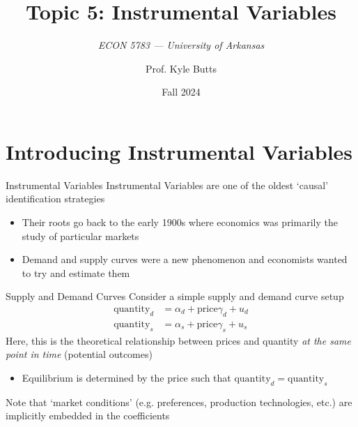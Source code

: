 \documentclass[aspectratio=169,t,11pt,table]{beamer}
\title{Topic 5: Instrumental Variables}
\subtitle{\it  ECON 5783 — University of Arkansas}
\date{Fall 2024}
\author{Prof. Kyle Butts}
\begin{document}
\begin{frame}
\maketitle

\end{frame}

\section{Introducing Instrumental Variables}

\begin{frame}{Instrumental Variables}
  Instrumental Variables are one of the oldest `causal' identification strategies
  \begin{itemize}
    \item Their roots go back to the early 1900s where economics was primarily the study of particular markets
    
    \item Demand and supply curves were a new phenomenon and economists wanted to try and estimate them 
  \end{itemize}
\end{frame}

\begin{frame}{Supply and Demand Curves}
  Consider a simple supply and demand curve setup
  \begin{align}
    \text{quantity}_{d} &= \alpha_{d} + \text{price}\gamma_{d} + u_{d} \\
    \text{quantity}_{s} &= \alpha_{s} + \text{price}\gamma_{s} + u_{s}
  \end{align}
  Here, this is the theoretical relationship between prices and quantity \emph{at the same point in time} (potential outcomes)
  \begin{itemize}
    \item Equilibrium is determined by the $\text{price}$ such that $\text{quantity}_{d} = \text{quantity}_{s}$
  \end{itemize}

  \bigskip
  Note that `market conditions' (e.g. preferences, production technologies, etc.) are implicitly embedded in the coefficients
\end{frame}
\end{document}
